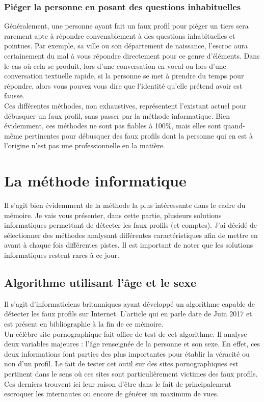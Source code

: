 \documentclass[12pt]{report}
\begin{document}
\subsubsection{Piéger la personne en posant des questions inhabituelles}
Généralement, une personne ayant fait un faux profil pour piéger un tiers sera rarement apte à répondre convenablement à des questions inhabituelles et pointues. Par exemple, sa ville ou son département de naissance, l'escroc aura certainement du mal à vous répondre directement pour ce genre d'éléments. Dans le cas où cela se produit, lors d'une conversation en vocal ou lors d'une conversation textuelle rapide, si la personne se met à prendre du temps pour répondre, alors vous pouvez vous dire que l'identité qu'elle prétend avoir est fausse. \\

Ces différentes méthodes, non exhaustives, représentent l'existant actuel pour débusquer un faux profil, sans passer par la méthode informatique. Bien évidemment, ces méthodes ne sont pas fiables à 100\%, mais elles sont quand-même pertinentes pour débusquer des faux profils dont la personne qui en est à l'origine n'est pas une professionnelle en la matière.

\section{La méthode informatique}
Il s'agit bien évidemment de la méthode la plus intéressante dans le cadre du mémoire. Je vais vous présenter, dans cette partie, plusieurs solutions informatiques permettant de détecter les faux profils (et comptes). J'ai décidé de sélectionner des méthodes analysant différentes caractéristiques afin de mettre en avant à chaque fois différentes pistes. Il est important de noter que les solutions informatiques restent rares à ce jour. 

\subsection{Algorithme utilisant l'âge et le sexe}
Il s'agit d'informaticiens britanniques ayant développé un algorithme capable de détecter les faux profils sur Internet. L'article qui en parle date de Juin 2017 et est présent en bibliographie à la fin de ce mémoire. \\

Un célèbre site pornographique fait office de test de cet algorithme. Il analyse deux variables majeures : l'âge renseignée de la personne et son sexe. En effet, ces deux informations font parties des plus importantes pour établir la véracité ou non d'un profil. Le fait de tester cet outil sur des sites pornographiques est pertinent dans le sens où ces sites sont particulièrement victimes des faux profils. Ces derniers trouvent ici leur raison d'être dans le fait de principalement escroquer les internautes ou encore de générer un maximum de vues. \\
\end{document}
